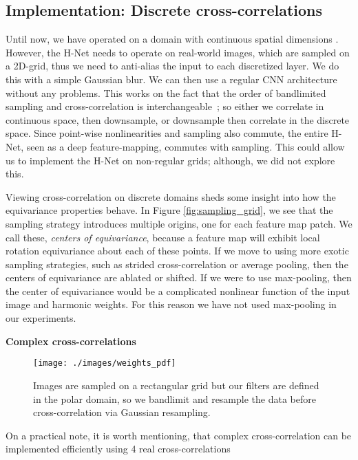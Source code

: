\documentclass[10pt,twocolumn,letterpaper]{article}
\begin{document}
\subsection{Implementation: Discrete cross-correlations}
\label{sec:sampling}
Until now, we have operated on a domain with continuous spatial dimensions . However, the H-Net needs to operate on real-world images, which are sampled on a 2D-grid, thus we need to anti-alias the input to each discretized layer. We do this with a simple Gaussian blur. We can then use a regular CNN architecture without any problems. This works on the fact that the order of bandlimited sampling and cross-correlation is interchangeable~\cite{freeman1991design}; so either we correlate in continuous space, then downsample, or downsample then correlate in the discrete space. Since point-wise nonlinearities and sampling also commute, the entire H-Net, seen as a deep feature-mapping, commutes with sampling. This could allow us to implement the H-Net on non-regular grids; although, we did not explore this. 

Viewing cross-correlation on discrete domains sheds some insight into how the equivariance properties behave. In Figure \ref{fig:sampling_grid}, we see that the sampling strategy introduces multiple origins, one for each feature map patch. We call these, \emph{centers of equivariance}, because a feature map will exhibit local rotation equivariance about each of these points. If we move to using more exotic sampling strategies, such as strided cross-correlation or average pooling, then the centers of equivariance are ablated or shifted. If we were to use max-pooling, then the center of equivariance would be a complicated nonlinear function of the input image and harmonic weights. For this reason we have not used max-pooling in our experiments.

\textbf{Complex cross-correlations}
\begin{figure}[t]
\begin{center}
	\texttt{[image: ./images/weights\_pdf]}
\end{center}
\vspace{-1em}
\caption{Images are sampled on a rectangular grid but our filters are defined in the polar domain, so we bandlimit and resample the data before cross-correlation via Gaussian resampling.}
\label{fig:weights}
\vspace{-1em}
\end{figure}
On a practical note, it is worth mentioning, that complex cross-correlation can be implemented efficiently using 4 real cross-correlations
\end{document}
